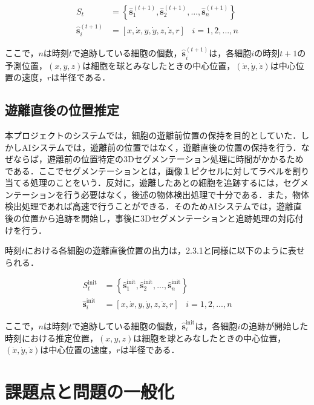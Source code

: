 \begin{equation}
    \label{output1}
    \begin{aligned}
        S_t &= \left\{\hat{\bm{s}}_1^{(t+1)}, \hat{\bm{s}}_2^{(t+1)}, ..., \hat{\bm{s}}_n^{(t+1)}\right\}
        \\ \hat{\bm{s}}_i^{(t+1)} &= \left[x, \dot{x}, y, \dot{y}, z, \dot{z}, r\right] \hspace{10pt} i = 1,2,...,n
    \end{aligned}
\end{equation}

ここで，$n$は時刻$t$で追跡している細胞の個数，$\hat{\bm{s}}_i^{(t+1)}$は，各細胞$i$の時刻$t+1$の予測位置，$(x,y,z)$は細胞を球とみなしたときの中心位置，$(\dot{x},\dot{y}, \dot{z})$は中心位置の速度，$r$は半径である．

\subsection{遊離直後の位置推定}
本プロジェクトのシステムでは，細胞の遊離前位置の保持を目的としていた．しかしAIシステムでは，遊離前の位置ではなく，遊離直後の位置の保持を行う．なぜならば，遊離前の位置特定の3Dセグメンテーション処理に時間がかかるためである．ここでセグメンテーションとは，画像１ピクセルに対してラベルを割り当てる処理のことをいう．反対に，遊離したあとの細胞を追跡するには，セグメンテーションを行う必要はなく，後述の物体検出処理で十分である．また，物体検出処理であれば高速で行うことができる．そのためAIシステムでは，遊離直後の位置から追跡を開始し，事後に3Dセグメンテーションと追跡処理の対応付けを行う．
\par
時刻$t$における各細胞の遊離直後位置の出力は，2.3.1と同様に以下のように表せられる．

\begin{equation}
    \label{output1}
    \begin{aligned}
        S_t^{\textrm{init}} &= \left\{\hat{\bm{s}}_1^{\textrm{init}}, \hat{\bm{s}}_2^{\textrm{init}}, ..., \hat{\bm{s}}_n^{\textrm{init}}\right\}
        \\ \hat{\bm{s}}_i^{\textrm{init}} &= \left[x, \dot{x}, y, \dot{y}, z, \dot{z}, r\right] \hspace{10pt} i = 1,2,...,n
    \end{aligned}
\end{equation}

ここで，$n$は時刻$t$で追跡している細胞の個数，$\hat{\bm{s}}_i^{\textrm{init}}$は，各細胞$i$の追跡が開始した時刻における推定位置，$(x,y,z)$は細胞を球とみなしたときの中心位置，$(\dot{x},\dot{y}, \dot{z})$は中心位置の速度，$r$は半径である．

\section{課題点と問題の一般化}